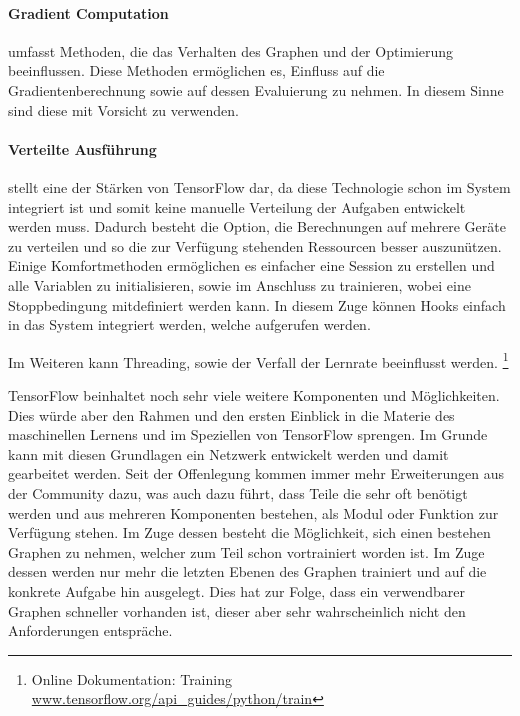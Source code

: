 \paragraph{Gradient Computation} umfasst Methoden, die das Verhalten des Graphen und der Optimierung beeinflussen. 
Diese Methoden ermöglichen es, Einfluss auf die Gradientenberechnung sowie auf dessen Evaluierung zu nehmen. 
In diesem Sinne sind diese mit Vorsicht zu verwenden.

\paragraph{Verteilte Ausführung} stellt eine der Stärken von TensorFlow dar, da diese Technologie schon im System integriert ist und somit keine manuelle Verteilung der Aufgaben entwickelt werden muss. 
Dadurch besteht die Option, die Berechnungen auf mehrere Geräte zu verteilen und so die zur Verfügung stehenden Ressourcen besser auszunützen. \\

\noindent
Einige Komfortmethoden ermöglichen es einfacher eine Session zu erstellen und alle Variablen zu initialisieren, sowie im Anschluss zu trainieren, wobei eine Stoppbedingung mitdefiniert werden kann.
In diesem Zuge können Hooks einfach in das System integriert werden, welche aufgerufen werden.

\noindent
Im Weiteren kann Threading, sowie der Verfall der Lernrate beeinflusst werden. \footnote{Online Dokumentation: Training \url{www.tensorflow.org/api_guides/python/train}}
\phantom \newline



\noindent
TensorFlow beinhaltet noch sehr viele weitere Komponenten und Möglichkeiten. 
Dies würde aber den Rahmen und den ersten Einblick in die Materie des maschinellen Lernens und im Speziellen von TensorFlow sprengen. 
Im Grunde kann mit diesen Grundlagen ein Netzwerk entwickelt werden und damit gearbeitet werden. 
Seit der Offenlegung kommen immer mehr Erweiterungen aus der Community dazu, was auch dazu führt, dass Teile die sehr oft benötigt werden und aus mehreren Komponenten bestehen, als Modul oder Funktion zur Verfügung stehen. 
Im Zuge dessen besteht die Möglichkeit, sich einen bestehen Graphen zu nehmen, welcher zum Teil schon vortrainiert worden ist. 
Im Zuge dessen werden nur mehr die letzten Ebenen des Graphen trainiert und auf die konkrete Aufgabe hin ausgelegt. 
Dies hat zur Folge, dass ein verwendbarer Graphen schneller vorhanden ist, dieser aber sehr wahrscheinlich nicht den Anforderungen entspräche. 

